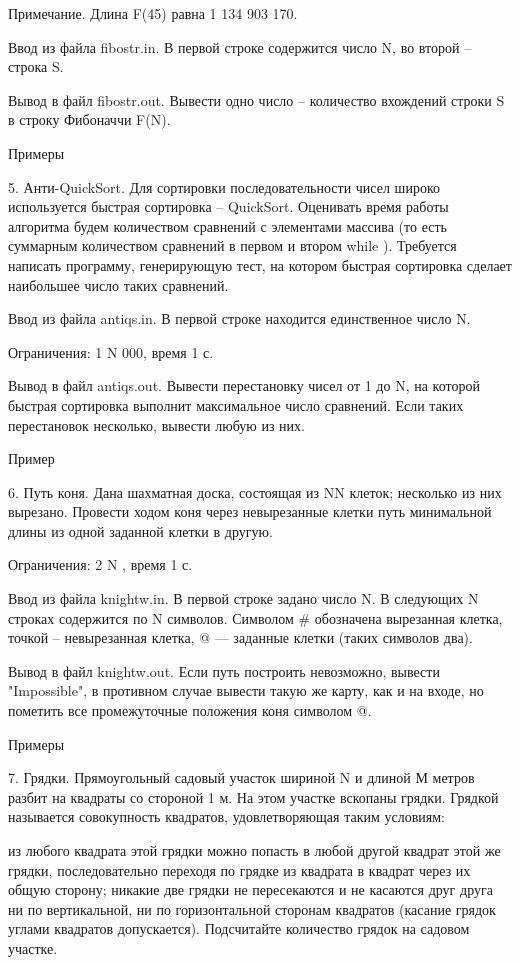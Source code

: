 \documentclass[]{article}
\begin{document}
\begin{enumerate}
Примечание. Длина F(45) равна 1 134 903 170.

Ввод из файла fibostr.in. В первой строке содержится число N, во второй – строка S.

Вывод в файл fibostr.out. Вывести одно число – количество вхождений строки S в строку Фибоначчи F(N).

Примеры



5. Анти-QuickSort. Для сортировки последовательности чисел широко используется быстрая сортировка – QuickSort. Оценивать время работы алгоритма будем количеством сравнений с элементами массива (то есть суммарным количеством сравнений в первом и втором while ). Требуется написать программу, генерирующую тест, на котором быстрая сортировка сделает наибольшее число таких сравнений.

Ввод из файла antiqs.in. В первой строке находится единственное число N.

Ограничения: 1 \leq N  000, время 1 с.

Вывод в файл antiqs.out. Вывести перестановку чисел от 1 до N, на которой быстрая сортировка выполнит максимальное число сравнений. Если таких перестановок несколько, вывести любую из них.

Пример



6. Путь коня. Дана шахматная доска, состоящая из N\times N клеток; несколько из них вырезано. Провести ходом коня через невырезанные клетки путь минимальной длины из одной заданной клетки в другую.

Ограничения: 2 \leq N , время 1 с.

Ввод из файла knightw.in. В первой строке задано число N. В следующих N строках содержится по N символов. Символом # обозначена вырезанная клетка, точкой – невырезанная клетка, @ — заданные клетки (таких символов два).

Вывод в файл knightw.out. Если путь построить невозможно, вывести "Impossible", в противном случае вывести такую же карту, как и на входе, но пометить все промежуточные положения коня символом @.

Примеры



7. Грядки. Прямоугольный садовый участок шириной N и длиной М метров разбит на квадраты со стороной 1 м. На этом участке вскопаны грядки. Грядкой называется совокупность квадратов, удовлетворяющая таким условиям:

из любого квадрата этой грядки можно попасть в любой другой квадрат этой же грядки, последовательно переходя по грядке из квадрата в квадрат через их общую сторону;
никакие две грядки не пересекаются и не касаются друг друга ни по вертикальной, ни по горизонтальной сторонам квадратов (касание грядок углами квадратов допускается).
Подсчитайте количество грядок на садовом участке.


\end{enumerate}
\end{document}
